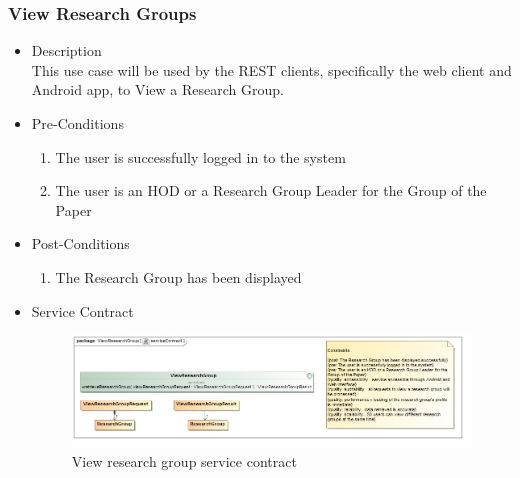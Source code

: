 \documentclass[a4paper,10pt]{article}
\begin{document}
	\subsubsection{View Research Groups}
	\begin{itemize}
		\item Description\\
		This use case will be used by the REST clients, specifically the web client and Android app, to View a Research Group.
		\item Pre-Conditions
		\begin{enumerate}
			\item The user is successfully logged in to the system
			\item The user is an HOD or a Research Group Leader for the Group of the Paper
		\end{enumerate}
		\item Post-Conditions
		\begin{enumerate}
			\item The Research Group has been displayed
			
		\end{enumerate}
		\item Service Contract
		\begin{figure}[H]
			\includegraphics[scale=0.5]{ViewResearchGroupServiceContract}
			\caption{View research group service contract}
		\end{figure}
	\end{itemize}
\end{document}
